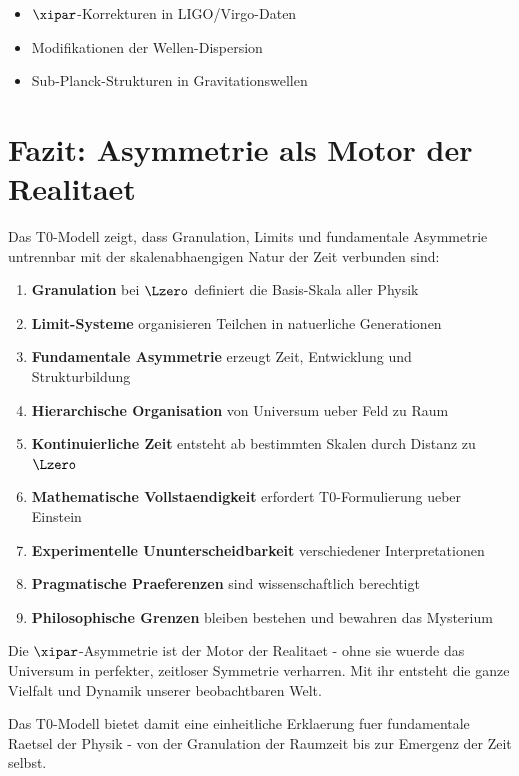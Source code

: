 	\begin{itemize}
		\item $\xipar$-Korrekturen in LIGO/Virgo-Daten
		\item Modifikationen der Wellen-Dispersion
		\item Sub-Planck-Strukturen in Gravitationswellen
	\end{itemize}
	
	\section{Fazit: Asymmetrie als Motor der Realitaet}
	
	Das T0-Modell zeigt, dass Granulation, Limits und fundamentale Asymmetrie untrennbar mit der skalenabhaengigen Natur der Zeit verbunden sind:
	
	\begin{enumerate}
		\item \textbf{Granulation} bei $\Lzero$ definiert die Basis-Skala aller Physik
		\item \textbf{Limit-Systeme} organisieren Teilchen in natuerliche Generationen
		\item \textbf{Fundamentale Asymmetrie} erzeugt Zeit, Entwicklung und Strukturbildung
		\item \textbf{Hierarchische Organisation} von Universum ueber Feld zu Raum
		\item \textbf{Kontinuierliche Zeit} entsteht ab bestimmten Skalen durch Distanz zu $\Lzero$
		\item \textbf{Mathematische Vollstaendigkeit} erfordert T0-Formulierung ueber Einstein
		\item \textbf{Experimentelle Ununterscheidbarkeit} verschiedener Interpretationen
		\item \textbf{Pragmatische Praeferenzen} sind wissenschaftlich berechtigt
		\item \textbf{Philosophische Grenzen} bleiben bestehen und bewahren das Mysterium
	\end{enumerate}
	
	Die $\xipar$-Asymmetrie ist der Motor der Realitaet - ohne sie wuerde das Universum in perfekter, zeitloser Symmetrie verharren. Mit ihr entsteht die ganze Vielfalt und Dynamik unserer beobachtbaren Welt.
	
	Das T0-Modell bietet damit eine einheitliche Erklaerung fuer fundamentale Raetsel der Physik - von der Granulation der Raumzeit bis zur Emergenz der Zeit selbst.

